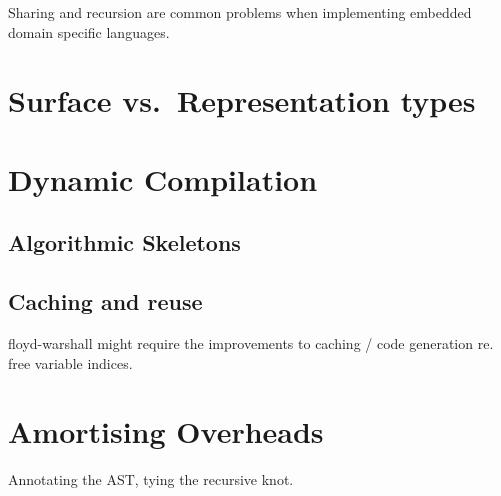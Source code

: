 Sharing and recursion are common problems when implementing embedded domain
specific languages.

\section{Surface vs.\ Representation types}

\section{Dynamic Compilation}
\label{sec:dynamic_compilation}

\subsection{Algorithmic Skeletons}

\subsection{Caching and reuse}
floyd-warshall might require the improvements to caching / code generation re.
free variable indices.

\section{Amortising Overheads}
Annotating the AST, tying the recursive knot.

